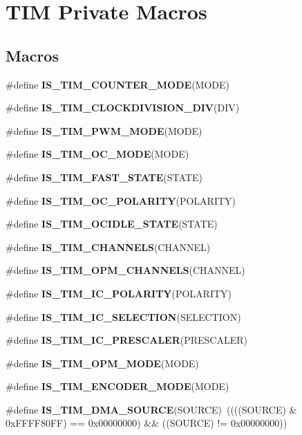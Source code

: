 \hypertarget{group___t_i_m___private___macros}{\section{T\-I\-M Private Macros}
\label{group___t_i_m___private___macros}
}
\subsection*{Macros}
\begin{DoxyCompactItemize}
\item 
\#define {\bfseries I\-S\-\_\-\-T\-I\-M\-\_\-\-C\-O\-U\-N\-T\-E\-R\-\_\-\-M\-O\-D\-E}(M\-O\-D\-E)
\item 
\#define {\bfseries I\-S\-\_\-\-T\-I\-M\-\_\-\-C\-L\-O\-C\-K\-D\-I\-V\-I\-S\-I\-O\-N\-\_\-\-D\-I\-V}(D\-I\-V)
\item 
\#define {\bfseries I\-S\-\_\-\-T\-I\-M\-\_\-\-P\-W\-M\-\_\-\-M\-O\-D\-E}(M\-O\-D\-E)
\item 
\#define {\bfseries I\-S\-\_\-\-T\-I\-M\-\_\-\-O\-C\-\_\-\-M\-O\-D\-E}(M\-O\-D\-E)
\item 
\#define {\bfseries I\-S\-\_\-\-T\-I\-M\-\_\-\-F\-A\-S\-T\-\_\-\-S\-T\-A\-T\-E}(S\-T\-A\-T\-E)
\item 
\#define {\bfseries I\-S\-\_\-\-T\-I\-M\-\_\-\-O\-C\-\_\-\-P\-O\-L\-A\-R\-I\-T\-Y}(P\-O\-L\-A\-R\-I\-T\-Y)
\item 
\#define {\bfseries I\-S\-\_\-\-T\-I\-M\-\_\-\-O\-C\-I\-D\-L\-E\-\_\-\-S\-T\-A\-T\-E}(S\-T\-A\-T\-E)
\item 
\#define {\bfseries I\-S\-\_\-\-T\-I\-M\-\_\-\-C\-H\-A\-N\-N\-E\-L\-S}(C\-H\-A\-N\-N\-E\-L)
\item 
\#define {\bfseries I\-S\-\_\-\-T\-I\-M\-\_\-\-O\-P\-M\-\_\-\-C\-H\-A\-N\-N\-E\-L\-S}(C\-H\-A\-N\-N\-E\-L)
\item 
\#define {\bfseries I\-S\-\_\-\-T\-I\-M\-\_\-\-I\-C\-\_\-\-P\-O\-L\-A\-R\-I\-T\-Y}(P\-O\-L\-A\-R\-I\-T\-Y)
\item 
\#define {\bfseries I\-S\-\_\-\-T\-I\-M\-\_\-\-I\-C\-\_\-\-S\-E\-L\-E\-C\-T\-I\-O\-N}(S\-E\-L\-E\-C\-T\-I\-O\-N)
\item 
\#define {\bfseries I\-S\-\_\-\-T\-I\-M\-\_\-\-I\-C\-\_\-\-P\-R\-E\-S\-C\-A\-L\-E\-R}(P\-R\-E\-S\-C\-A\-L\-E\-R)
\item 
\#define {\bfseries I\-S\-\_\-\-T\-I\-M\-\_\-\-O\-P\-M\-\_\-\-M\-O\-D\-E}(M\-O\-D\-E)
\item 
\#define {\bfseries I\-S\-\_\-\-T\-I\-M\-\_\-\-E\-N\-C\-O\-D\-E\-R\-\_\-\-M\-O\-D\-E}(M\-O\-D\-E)
\item 
\hypertarget{group___t_i_m___private___macros_gafb9cb1995ea4cd37db6032d80a49cd47}{\#define {\bfseries I\-S\-\_\-\-T\-I\-M\-\_\-\-D\-M\-A\-\_\-\-S\-O\-U\-R\-C\-E}(S\-O\-U\-R\-C\-E)~((((S\-O\-U\-R\-C\-E) \& 0x\-F\-F\-F\-F80\-F\-F) == 0x00000000) \&\& ((\-S\-O\-U\-R\-C\-E) != 0x00000000))}\label{group___t_i_m___private___macros_gafb9cb1995ea4cd37db6032d80a49cd47}


\end{DoxyCompactItemize}
